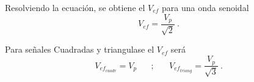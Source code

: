             \noindent Resolviendo la ecuación, se obtiene el \(V_{ef}\) 
            para una onda senoidal 
            \begin{equation*}
                V_{ef} = \dfrac{V_p}{\sqrt{2}}~.    
            \end{equation*}    

            \noindent Para señales Cuadradas y triangulase el \(V_{ef}\) será
            \begin{equation*}
                V_{ef_{cuadr}}  =  V_p \hspace{20pt} ; \hspace{20pt}
                V_{ef_{triang}} = \dfrac{V_p}{\sqrt{3}}~.
            \end{equation*}